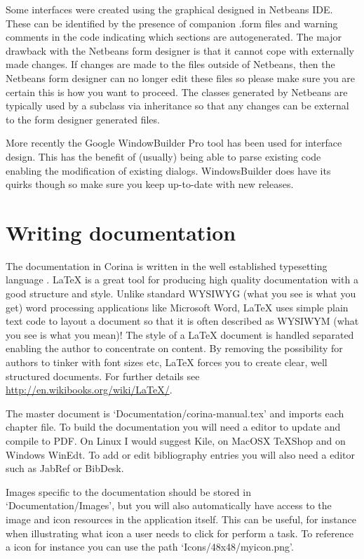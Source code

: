 Some interfaces were created using the graphical designed in Netbeans IDE.  These can be identified by the presence of companion .form files and warning comments in the code indicating which sections are autogenerated.  The major drawback with the Netbeans form designer is that it cannot cope with externally made changes.   If changes are made to the files outside of Netbeans, then the Netbeans form designer can no longer edit these files so please make sure you are certain this is how you want to proceed.  The classes generated by Netbeans are typically used by a subclass via inheritance so that any changes can be external to the form designer generated files. 

More recently the Google WindowBuilder Pro tool has been used for interface design.  This has the benefit of (usually) being able to parse existing code enabling the modification of existing dialogs.  WindowsBuilder does have its quirks though so make sure you keep up-to-date with new releases.

\section{Writing documentation}
The documentation in Corina is written in the well established typesetting language {\LaTeXe}.  {\LaTeX} is a great tool for producing high quality documentation with a good structure and style.  Unlike standard WYSIWYG (what you see is what you get) word processing applications like Microsoft Word, {\LaTeX} uses simple plain text code to layout a document so that it is often described as WYSIWYM (what you see is what you mean)!  The style of a {\LaTeX} document is handled separated enabling the author to concentrate on content.  By removing the possibility for authors to tinker with font sizes etc, {\LaTeX} forces you to create clear, well structured documents.  For further details see \url{http://en.wikibooks.org/wiki/LaTeX/}.

The master document is `Documentation/corina-manual.tex' and imports each chapter file.  To build the documentation you will need a editor to update and compile to PDF.  On Linux I would suggest Kile, on MacOSX TeXShop and on Windows WinEdt.  To add or edit bibliography entries you will also need a {\BibTeX} editor such as JabRef or BibDesk.

Images specific to the documentation should be stored in `Documentation/Images', but you will also automatically have access to the image and icon resources in the application itself.  This can be useful, for instance when illustrating what icon a user needs to click for perform a task.  To reference a icon for instance you can use the path `Icons/48x48/myicon.png'.

